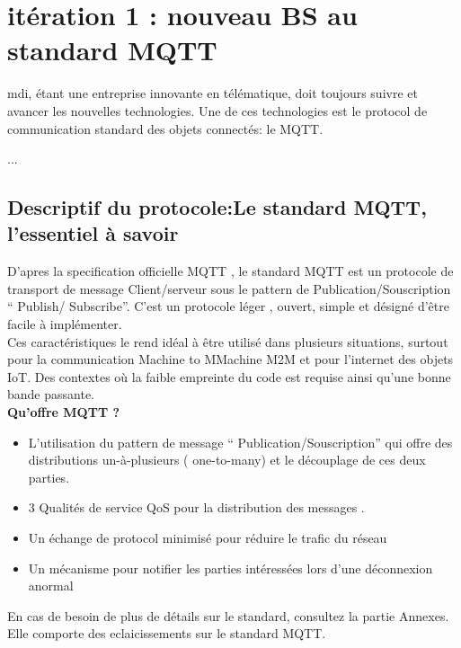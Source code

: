 \section{itération 1 : nouveau BS au standard MQTT}
        \gls{mdi}, étant une entreprise innovante en télématique, doit toujours
        suivre et avancer les nouvelles technologies. Une de ces technologies
        est le protocol de communication standard des objets connectés: le MQTT.

        ...
        


    \subsection{Descriptif du protocole:Le standard MQTT, l'essentiel à savoir}
    D’apres la specification officielle MQTT \cite{mqtt_site},
    le standard MQTT est un protocole de transport de message Client/serveur sous le pattern de Publication/Souscription 
    “ Publish/ Subscribe”. 
    C'est un protocole léger , ouvert, simple et désigné d’être facile à implémenter. \\
    Ces caractéristiques le rend idéal à être utilisé dans plusieurs situations, surtout pour la communication Machine 
    to MMachine M2M et pour l’internet des objets IoT. Des contextes où la faible empreinte du code est requise ainsi 
    qu’une bonne bande passante.     \\
    
    {
        \large 
        \centering
        \textbf{Qu’offre MQTT ? }\\
    
    }   
   
    \begin{itemize}
        \renewcommand{\labelitemi}{$\bullet$}
        \item L’utilisation du pattern de message “ Publication/Souscription” qui offre 
        des distributions un-à-plusieurs ( one-to-many) et le découplage de ces deux parties.    
        \item 3 Qualités de service QoS pour la distribution des messages . 
        \item Un échange de protocol minimisé pour réduire le trafic  du réseau      
        \item Un mécanisme pour notifier les parties intéressées lors d'une déconnexion anormal    
    \end{itemize}   
    \bigskip 
    En cas de besoin de plus de détails sur le standard, consultez la partie Annexes. Elle comporte des eclaicissements 
    sur le standard MQTT.\\

